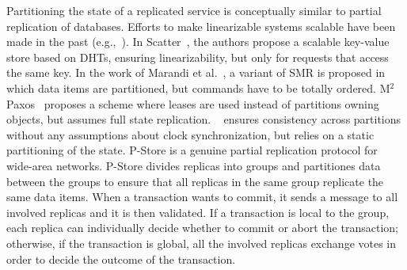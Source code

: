 Partitioning the state of a replicated service is conceptually similar to
partial replication of databases. Efforts to make linearizable systems scalable
have been made in the past (e.g.,~\cite{bezerra2014ssmr, corbett2013spanner,
Glendenning:2011kj, Marandi:2011dj}).  In Scatter~\cite{Glendenning:2011kj}, the
authors propose a scalable key-value store based on DHTs, ensuring
linearizability, but only for requests that access the same key. In the work of
Marandi et al.~\cite{Marandi:2011dj}, a variant of SMR is proposed in which data
items are partitioned, but commands have to be totally ordered.
M$^2$Paxos~\cite{7579738} proposes a scheme where leases are
used instead of partitions owning objects, but assumes full state replication.
\ssmr{}~\cite{bezerra2014ssmr} ensures consistency across partitions without any
assumptions about clock synchronization, but relies on a static partitioning of
the state. P-Store \cite{schiper2010p} is a genuine partial replication
protocol for wide-area networks. P-Store divides replicas into groups and
partitiones data between the groups to ensure that all replicas in the same
group replicate the same data items. When a transaction wants to commit, it sends
a message to all involved replicas and it is then validated. If a transaction is local to the
group, each replica can individually decide whether to commit or abort the transaction;
otherwise, if the transaction is global, all the involved replicas exchange
votes in order to decide the outcome of the transaction.


